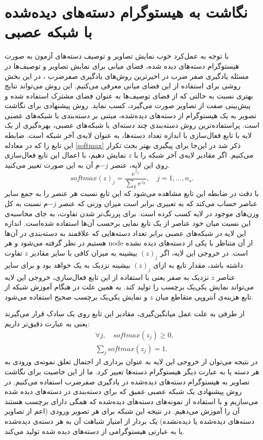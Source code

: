 \section{نگاشت به هیستوگرام دسته‌های دیده‌شده با شبکه عصبی} \label{hist}
با توجه به عمل‌کرد خوب نمایش تصاویر و توصیف دسته‌های آزمون به صورت  هیستوگرام دسته‌های دیده شده،  فضای میانی برای نمایش تصاویر و توصیف‌ها در مسئله یادگیری صفر ضرب در اخیرترین روش‌های یادگیری صفرضرب  \cite{sse}،
در این بخش روشی برای استفاده از این فضای میانی معرفی می‌کنیم. این روش می‌تواند نتایج بهتری نسبت به حالتی که از فضای توصیف‌ها به عنوان فضای مشترک استفاده شده و پیش‌بینی صفت از تصاویر صورت می‌گیرد، کسب نماید.
 روش پیشنهادی برای نگاشت تصویر به یک هیستوگرام از دسته‌های دیده‌شده، مبتنی بر دسته‌بندی با شبکه‌های عصبی است. پراستفاده‌ترین روش دسته‌بندی چند دسته‌ای با شبکه‌های عصبی، بهره‌گیری از یک لایه با تابع فعال‌سازی  با اندازه تعداد دسته‌ها، به عنوان لایه‌ی آخر شبکه است. ضابطه این تابع را که در معادله \eqref{softmax} ذکر شد در این‌جا برای پیگیری بهتر بحث تکرار می‌کنیم. اگر مقادیر لایه‌ی آخر شبکه را با $z$ نمایش دهیم، با اعمال این تابع فعال‌سازی روی این لایه، عنصر $-j$م آن به این صورت تغییر می‌کنید.
 \begin{equation*}
 softmax(z)_j = \frac{e^{z_j}}{\sum_k e^{z_k}}, \quad j = 1, \ldots, n_s.
 \end{equation*}
با دقت در ضابطه این تابع مشاهده می‌شود که این تابع نسبت هر عنصر را به جمع سایر عناصر حساب می‌کند که به تعبیری برابر است میزان وزنی که عنصر $-j$م نسبت به کل وزن‌های موجود در لایه کسب کرده است.
 برای پررنگ‌تر شدن تفاوت، به جای محاسبه‌ی این نسبت میان خود عناصر از یک تابع نمایی برحسب آن‌ها استفاده شده‌است. اندازه این لایه در شبکه‌های عصبی برابر تعداد دسته‌هایی که علاقمند به دسته‌بندی در ‌آن‌ها هستیم در نظر گرفته می‌شود و هر
\gls{node}
از آن متناظر با یکی از دسته‌های دیده نشده است. در خروجی این لایه، اگر $(z)_j$ بیشینه به میزان کافی با سایر مقادیر $z$ تفاوت داشته باشد، مقدار تابع به ازای  $(z)_j$ بیشینه نزدیک به یک خواهد بود  و برای سایر عناصر $z$ نزدیک به صفر یعنی با استفاده از این تابع فعال‌سازی، خروجی این لایه می‌تواند نمایش یکی‌یک برچسب را تولید کند. به همین علت در هنگام آموزش شبکه از تابع هزینه‌ی آنتروپی متقاطع میان $z$ و نمایش یکی‌یک برچسب صحیح استفاده می‌شود.

از طرفی به علت عمل میانگین‌گیری، مقادیر این تابع روی یک سادک قرار می‌گیرند یعنی به عبارت دقیق‌تر داریم:
\begin{align}
&\forall j, \quad softmax(z_j) \geq 0, \\
& \sum_j softmax(z_j) = 1.
\end{align}
در نتیجه می‌توان از خروجی این لایه به عنوان برداری از احتمال تعلق نمونه‌ی ورودی به هر دسته یا به عبارت دیگر هیستوگرام دسته‌ها تعبیر کرد. ما از این خاصیت برای نگاشت تصاویر به هیستوگرام دسته‌های دیده‌شده در یادگیری صفرضرب استفاده می‌کنیم. در روش پیشنهادی یک شبکه عصبی عمیق که برای دسته‌بندی در دسته‌های دیده شده می‌سازیم و با استفاده از نمونه‌های دسته‌های دیده‌شده که همگی دارای برچسب هستند آن را آموزش می‌دهیم. در نتیجه این شبکه برای هر تصویر ورودی (اعم از تصاویر دسته‌های دیده‌شده یا دیده‌نشده) یک بردار از امتیاز شباهت آن به هر دسته‌ی دیده‌شده یا به عبارتی هیستوگرامی از دسته‌های دیده شده تولید می‌کند.

